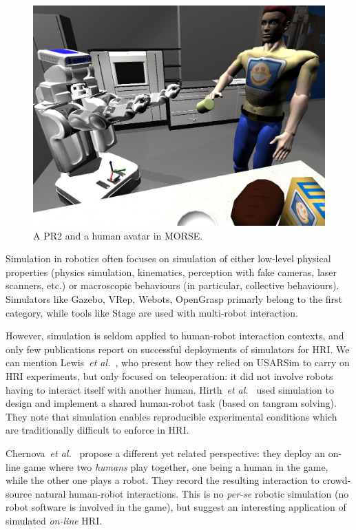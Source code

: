 \documentclass[conference]{IEEEtran}
\newcommand{\etal}{{\textit{et al.~}}}
\begin{document}
\begin{figure}[ht!]
      \centering
      \includegraphics[width=0.9\linewidth]{morse_pr2.jpg}
      \caption{A PR2 and a human avatar in MORSE.}
      \label{fig|morse-hri}
\end{figure}



Simulation in robotics often focuses on simulation of either low-level physical
properties (physics simulation, kinematics, perception with fake cameras, laser
scanners, etc.) or macroscopic behaviours (in particular, collective
behaviours). Simulators like Gazebo, VRep, Webots, OpenGrasp 
primarly belong to the first category, while tools like Stage  are used with multi-robot interaction.

However, simulation is seldom applied to human-robot interaction contexts, and
only few publications report on successful deployments of simulators for HRI.
We can mention Lewis~\etal\cite{lewis2007usarsim}, who present how they relied
on {\sc USARSim} to carry on HRI experiments, but only focused on
teleoperation: it did not involve robots having to interact itself with another
human.  Hirth~\etal\cite{hirth2013development} used simulation to design and
implement a shared human-robot task (based on tangram solving). They note that
simulation enables reproducible experimental conditions which are traditionally
difficult to enforce in HRI.

Chernova~\etal\cite{Chernova2011} propose a different yet related perspective:
they deploy an on-line game where two \emph{humans} play together, one being a
human in the game, while the other one plays a robot. They record the resulting
interaction to crowd-source natural human-robot interactions. This is no
\textit{per-se} robotic simulation (no robot software is involved in the game),
but suggest an interesting application of simulated \emph{on-line} HRI.
\end{document}
